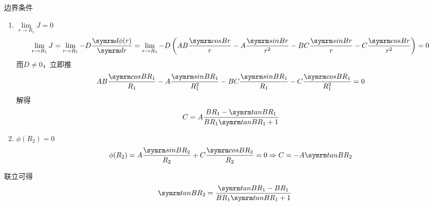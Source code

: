 \begin{exercise}
\begin{solution}
        边界条件
        \begin{enumerate}[(1)]
            \item $\lim\limits_{r\to R_1} J = 0$
            \begin{equation*}
                \lim_{r\to R_1} J = \lim_{r\to R_1} -D\dv{\phi(r)}{r} = \lim_{r\to R_1} -D\left(AB\frac{\ncos Br}{r} - A\frac{\nsin Br}{r^2} - BC\frac{\nsin Br}{r} - C\frac{\ncos Br}{r^2}\right) = 0
            \end{equation*}
            而$D \neq 0$，立即推
            \begin{equation*}
                AB\frac{\ncos BR_1}{R_1} - A\frac{\nsin BR_1}{R_1^2} - BC\frac{\nsin BR_1}{R_1} - C\frac{\ncos BR_1}{R_1^2} = 0
            \end{equation*}
            解得
            \begin{equation*}
                C = A\frac{BR_1 - \ntan BR_1}{BR_1 \ntan BR_1 + 1}
            \end{equation*}
            \item $\phi(R_2) = 0$
            \begin{equation*}
                \phi(R_2) = A\frac{\nsin BR_2}{R_2} + C\frac{\ncos BR_2}{R_2} = 0 \Rightarrow C = -A\ntan BR_2
            \end{equation*}
        \end{enumerate}
        联立可得
        \begin{equation*}
            \ntan BR_2 = \frac{\ntan BR_1 - BR_1}{BR_1\ntan BR_1 + 1}
        \end{equation*}
    \end{solution}
\end{exercise}

